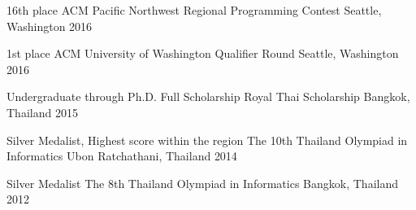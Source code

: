 
\begin{cvhonors}
  \cvhonor
    {16th place} %
    {ACM Pacific Northwest Regional Programming Contest} %
    {Seattle, Washington} %
    {2016} %

  \cvhonor
    {1st place} %
    {ACM University of Washington Qualifier Round} %
    {Seattle, Washington} %
    {2016} %

  \cvhonor
    {Undergraduate through Ph.D. Full Scholarship} %
    {Royal Thai Scholarship} %
    {Bangkok, Thailand} %
    {2015} %

  \cvhonor
    {Silver Medalist, Highest score within the region} %
    {The 10th Thailand Olympiad in Informatics} %
    {Ubon Ratchathani, Thailand} %
    {2014} %

  \cvhonor
    {Silver Medalist} %
    {The 8th Thailand Olympiad in Informatics} %
    {Bangkok, Thailand} %
    {2012} %

\end{cvhonors}
